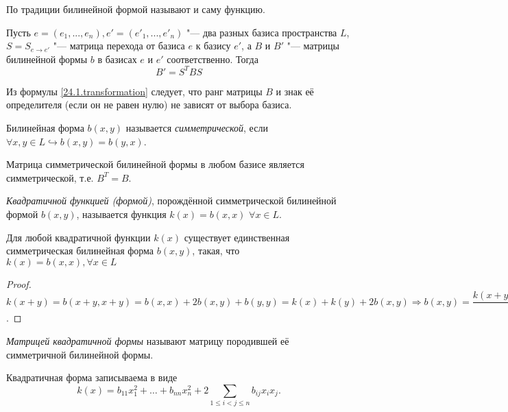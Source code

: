   \begin{notion} 
  По традиции билинейной формой называют и саму функцию.
  \end{notion}

  \begin{stt}
  Пусть $e=(e_1,...,e_n), e'=(e'_1,...,e'_n)$ "--- два разных базиса пространства $L$, $S=S_{e\rightarrow e'}$ "--- матрица перехода от базиса $e$ к базису $e'$, а $B$ и $B'$ "--- матрицы билинейной формы $b$ в базисах $e$ и $e'$ соответственно. Тогда 
  \begin{equation}\label{24.1.transformation}
  B'=S^TBS
  \end{equation}
  
  \end{stt}
  Из формулы \eqref{24.1.transformation} следует, что ранг матрицы $B$ и знак её определителя (если он не равен нулю) не зависят от выбора базиса.
  \begin{defn}
  Билинейная форма $b(x,y)$ называется \textit{симметрической}, если $\forall x,y \in L \hookrightarrow b(x,y)=b(y,x)$.
  \end{defn}
  \begin{stt}
  Матрица симметрической билинейной формы в любом базисе является симметрической, т.е. $B^T=B$.
  \end{stt}
  
  \begin{defn}
  \textit{Квадратичной функцией (формой)}, порождённой симметрической билинейной формой $ b(x,y) $, называется функция $k(x)=b(x,x)$  $\forall x \in L$.
  \end{defn}
  \begin{stt}
  Для любой квадратичной функции $k(x)$ существует единственная симметрическая билинейная форма $b(x,y)$, такая, что $k(x)=b(x,x), \forall x \in L$
  \end{stt}
  \begin{proof}
  $k(x+y)=b(x+y,x+y)=b(x,x)+2b(x,y)+b(y,y)=k(x)+k(y)+2b(x,y) \Rightarrow b(x,y)=\dfrac{k(x+y)-k(x)-k(y)}{2}$.
  \end{proof}
  \begin{defn}
  \textit{Матрицей квадратичной формы} называют матрицу породившей её симметричной билинейной формы.
  \end{defn}
  Квадратичная форма записываема в виде 			  \begin{equation}\label{24.1.common}
  k(x)=b_{11}x_1^2+\ldots+b_{nn}x_n^2+2\sum\limits_{1\le i<j\le n} b_{ij}x_ix_j.
  \end{equation} 
